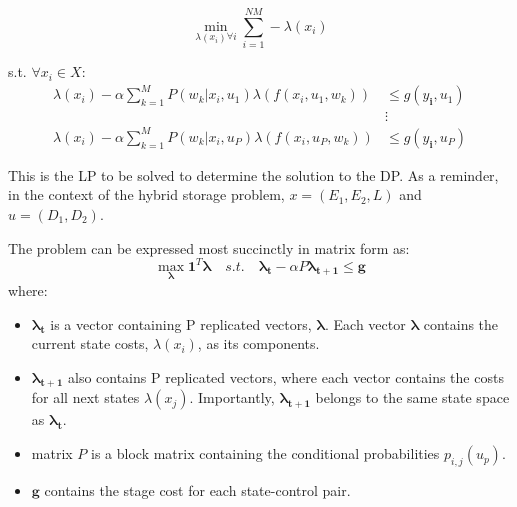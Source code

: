 \documentclass[conference]{IEEEtran}
\begin{document}
\begin{equation} \label{eq:prelimLP}
\min_{\lambda(x_{i}) \forall i} \sum_{i=1}^{NM} -\lambda(x_{i})
\end{equation}

s.t. $\forall x_{i} \in X$: \begin{align*}
\lambda(x_{i})-\alpha\sum_{k=1}^{M}P(w_{k} | x_{i},u_{1})\lambda(f(x_{i},u_{1},w_{k})) &\leq g(y_{\textbf{i}},u_{1}) \\
&\vdots\\
\lambda(x_{i})-\alpha\sum_{k=1}^{M}P(w_{k} | x_{i},u_{P})\lambda(f(x_{i},u_{P},w_{k})) &\leq g(y_{\textbf{i}},u_{P})
\end{align*}

This is the LP to be solved to determine the solution to the DP. As a reminder, in the context of the hybrid storage problem, $x=(E_{1},E_{2},L)$ and $u=(D_{1},D_{2})$.

The problem can be expressed most succinctly in matrix form as:
\begin{equation} \label{eq:prelimLPmtx}
    \max_{\boldsymbol{\lambda}} \boldsymbol{1}^{T} \boldsymbol{\lambda}
    \hspace{1em}s.t.\hspace{1em}
    \boldsymbol{\lambda_{t}}-\alpha P\boldsymbol{\lambda_{t+1}} \leq \boldsymbol{g}
\end{equation} where:

\begin{itemize}
	\item $\boldsymbol{\lambda_{t}}$ is a vector containing P replicated vectors, $\boldsymbol{\lambda}$. Each vector $\boldsymbol{\lambda}$ contains the current state costs, $\lambda(x_{i})$, as its components. %
	
	\item $\boldsymbol{\lambda_{t+1}}$ also contains P replicated vectors, where each vector contains the costs for all next states $\lambda(x_{j})$. Importantly, $\boldsymbol{\lambda_{t+1}}$ belongs to the same state space as $\boldsymbol{\lambda_{t}}$. %
	
	\item matrix $P$ is a block  matrix containing the conditional probabilities $p_{i,j}(u_{p})$. %
	
	\item $\boldsymbol{g}$ contains the stage cost for each state-control pair. %
\end{itemize}
\end{document}

